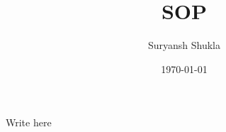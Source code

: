 \documentclass[a4paper, 12pt]{article}
\title{SOP}
\author{Suryansh Shukla}
\date{\today}
\begin{document}
	
	\maketitle

	Write here
\end{document}
